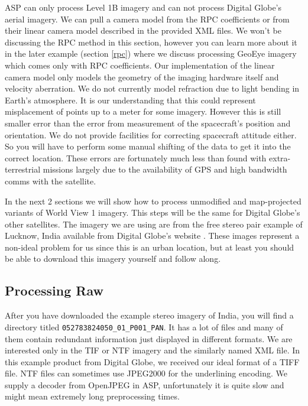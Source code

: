 ASP can only process Level 1B imagery and can not process Digital
Globe's aerial imagery. We can pull a camera model from the RPC
coefficients or from their linear camera model described in the
provided XML files. We won't be discussing the RPC method in this
section, however you can learn more about it in the later example (section \ref{rpc})
where we discuss processing GeoEye imagery which comes only with RPC
coefficients. Our implementation of the linear camera model only
models the geometry of the imaging hardware itself and velocity
aberration. We do not currently model refraction due to light bending
in Earth's atmosphere. It is our understanding that this could
represent misplacement of points up to a meter for some
imagery. However this is still smaller error than the error from
measurement of the spacecraft's position and orientation. We do not
provide facilities for correcting spacecraft attitude either. So you
will have to perform some manual shifting of the data to get it into
the correct location. These errors are fortunately much less than
found with extra-terrestrial missions largely due to the availability
of GPS and high bandwidth comms with the satellite.

In the next 2 sections we will show how to process unmodified and map-projected variants of World View 1 imagery. This steps will be the
same for Digital Globe's other satellites. The imagery we are using
are from the free stereo pair example of Lucknow, India available from
Digital Globe's website \cite{digital-globe:samples}. These images represent
a non-ideal problem for us since this is an urban location, but at
least you should be able to download this imagery yourself and follow
along.

\subsection{Processing Raw}
\label{rawdg}

After you have downloaded the example stereo imagery of India, you
will find a directory titled\newline
\texttt{052783824050\_01\_P001\_PAN}. It has a
lot of files and many of them contain redundant information just
displayed in different formats. We are interested only in the TIF or NTF
imagery and the similarly named XML file. In this example product from
Digital Globe, we received our ideal format of a TIFF file. NTF files
can sometimes use JPEG2000 for the underlining encoding. We supply a
decoder from OpenJPEG in ASP, unfortunately it is quite slow and might
mean extremely long preprocessing times.

